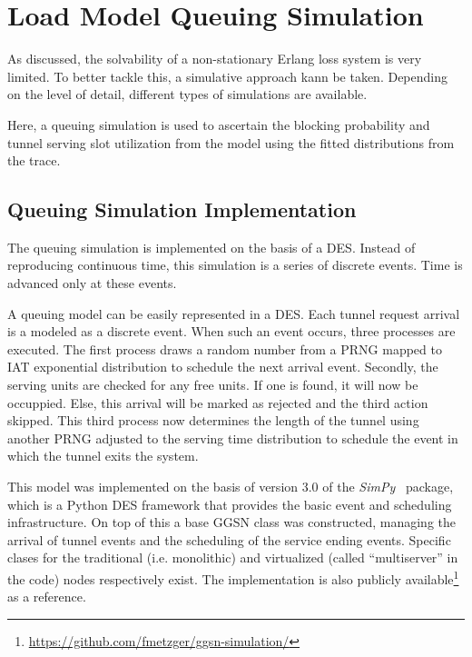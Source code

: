 \section{Load Model Queuing Simulation} 
\label{c4:simulation}

As discussed, the solvability of a non-stationary Erlang loss system is very limited. To better tackle this, a simulative approach kann be taken. Depending on the level of detail, different types of simulations are available.

Here, a queuing simulation is used to ascertain the blocking probability and tunnel serving slot utilization from the model using the fitted distributions from the trace.


\subsection{Queuing Simulation Implementation}

The queuing simulation is implemented on the basis of a \gls{DES}. Instead of reproducing continuous time, this simulation is a series of discrete events. Time is advanced only at these events. 

A queuing model can be easily represented in a \gls{DES}.  Each tunnel request arrival is a modeled as a discrete event. When such an event occurs, three processes are executed. The first process draws a random number from a \gls{PRNG} mapped to \gls{IAT} exponential distribution to schedule the next arrival event. Secondly, the serving units are checked for any free units. If one is found, it will now be occuppied. Else, this arrival will be marked as rejected and the third action skipped. This third process now determines the length of the tunnel using another \gls{PRNG} adjusted to the serving time distribution to schedule the event in which the tunnel exits the system.

This model was implemented on the basis of version 3.0 of the \textit{SimPy}~\cite{simpy} package, which is a Python \gls{DES} framework that provides the basic event and scheduling infrastructure. On top of this a base \gls{GGSN} class was constructed, managing the arrival of tunnel events and the scheduling of the service ending events. Specific clases for the traditional (i.e. monolithic) and virtualized (called ``multiserver'' in the code) nodes respectively exist. The implementation is also publicly available\footnote{\url{https://github.com/fmetzger/ggsn-simulation/}} as a reference. 


